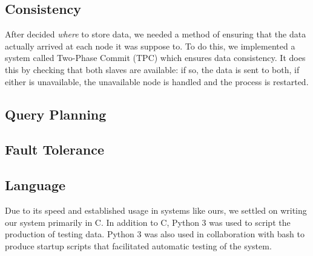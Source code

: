 \subsection{Consistency}
After decided \emph{where} to store data, we needed a method of ensuring that the data actually arrived at each node it was suppose to.
To do this, we implemented a system called Two-Phase Commit (TPC) which ensures data consistency.
It does this by checking that both slaves are available: if so, the data is sent to both, if either is unavailable, the unavailable node is handled and the process is restarted.
%
\subsection{Query Planning}
%
\subsection{Fault Tolerance}
%
\subsection{Language}
Due to its speed and established usage in systems like ours, we settled on writing our system primarily in C.
In addition to C, Python 3 was used to script the production of testing data.
Python 3 was also used in collaboration with bash to produce startup scripts that facilitated automatic testing of the system.
